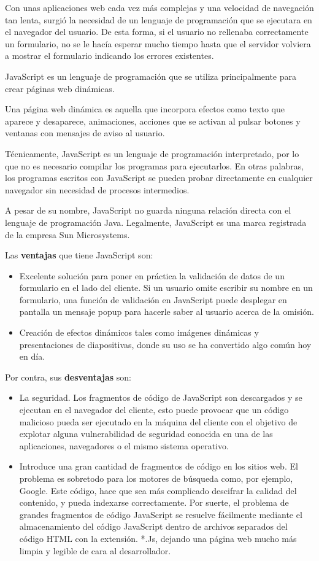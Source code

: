 \documentclass[a4paper, 12pt]{book}
\begin{document}
Con unas aplicaciones web cada vez más complejas y una velocidad de navegación tan lenta, surgió la necesidad de un lenguaje de programación que se ejecutara en el navegador del usuario. De esta forma, si el usuario no rellenaba correctamente un formulario, no se le hacía esperar mucho tiempo hasta que el servidor volviera a mostrar el formulario indicando los errores existentes.

JavaScript es un lenguaje de programación que se utiliza principalmente para crear páginas web dinámicas.

Una página web dinámica es aquella que incorpora efectos como texto que aparece y desaparece, animaciones, acciones que se activan al pulsar botones y ventanas con mensajes de aviso al usuario.

Técnicamente, JavaScript es un lenguaje de programación interpretado, por lo que no es necesario compilar los programas para ejecutarlos. En otras palabras, los programas escritos con JavaScript se pueden probar directamente en cualquier navegador sin necesidad de procesos intermedios.

A pesar de su nombre, JavaScript no guarda ninguna relación directa con el lenguaje de programación Java. Legalmente, JavaScript es una marca registrada de la empresa Sun Microsystems.

Las \textbf{ventajas }que tiene JavaScript son:
\begin{itemize}
\item Excelente solución para poner en práctica la validación de datos de un formulario en el lado del cliente. Si un usuario omite escribir su nombre en un formulario, una función de validación en JavaScript puede desplegar en pantalla un mensaje popup para hacerle saber al usuario acerca de la omisión.

\item Creación de efectos dinámicos tales como imágenes dinámicas y presentaciones de diapositivas, donde su uso se ha convertido algo común hoy en día.
\end{itemize}
Por contra, sus \textbf{desventajas } son:
\begin{itemize}
\item La seguridad. Los fragmentos de código de JavaScript son descargados y se ejecutan en el navegador del cliente, esto puede provocar que un código malicioso pueda ser ejecutado en la máquina del cliente con el objetivo de explotar alguna vulnerabilidad de seguridad conocida en una de las aplicaciones, navegadores o el mismo sistema operativo.

\item Introduce una gran cantidad de fragmentos de código en los sitios web. El problema es sobretodo  para los motores de búsqueda como, por ejemplo, Google. Este código, hace que sea más complicado descifrar la calidad del contenido, y pueda indexarse correctamente. Por suerte, el problema de grandes fragmentos de código JavaScript se resuelve fácilmente mediante el almacenamiento del código JavaScript dentro de archivos separados del código HTML con la extensión. *.Js, dejando una página web mucho más limpia y legible de cara al desarrollador. 
\end{itemize}
\end{document}
